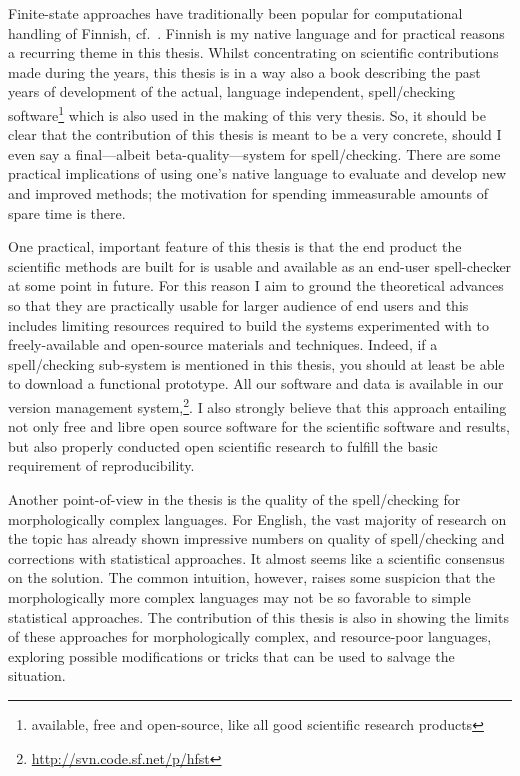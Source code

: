 \documentclass[officiallayout]{unihelcompling}
\begin{document}
Finite-state approaches have traditionally been popular for computational
handling of Finnish, cf.~\citet{koskenniemi1983twolevel}. Finnish is my native
language and for practical reasons a recurring theme in this thesis. Whilst
concentrating on scientific contributions made during the years, this thesis is
in a way also a book describing the past years of development of the actual,
language independent, spell\-/checking software\footnote{available, free and
open-source, like all good scientific research products} which is also used in
the making of this very thesis. So, it should be clear that the contribution of
this thesis is meant to be a very concrete, should I even say a final---albeit
beta-quality---system for spell\-/checking.  There are some practical
implications of using one's native language to evaluate and develop new and
improved methods; the motivation for spending immeasurable amounts of spare
time is there.

One practical, important feature of this thesis is that the end product the
scientific methods are built for is usable and available as an end-user
spell-checker at some point in future. For this reason I aim to ground the
theoretical advances so that they are practically usable for larger audience of
end users and this includes limiting resources required to build the systems
experimented with to freely-available and open-source materials and techniques.
Indeed, if a spell\-/checking sub-system is mentioned in this thesis, you
should at least be able to download a functional prototype.  All our software
and data is available in our version management
system,\footnote{\url{http://svn.code.sf.net/p/hfst}}. I also strongly believe
that this approach entailing not only free and libre open source software for
the scientific software and results, but also properly conducted open
scientific research to fulfill the basic requirement of reproducibility.

Another point-of-view in the thesis is the quality of the spell\-/checking for
morphologically complex languages. For English, the vast majority of
research on the topic has already shown impressive numbers on quality of
spell\-/checking and corrections with statistical approaches. It almost seems
like a scientific consensus on the solution. The common intuition,
however, raises some suspicion that the morphologically more complex languages
may not be so favorable to simple statistical approaches. The contribution of
this thesis is also in showing the limits of these approaches for
morphologically complex, and resource-poor languages, exploring possible
modifications or tricks that can be used to salvage the situation.
\end{document}

